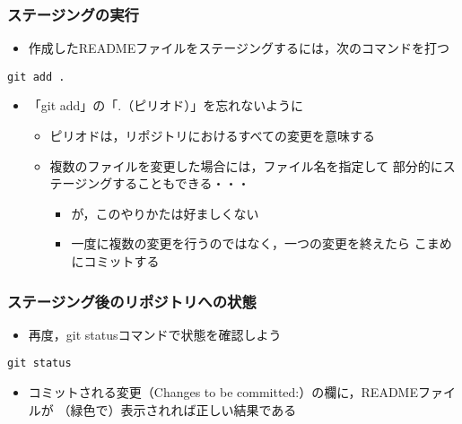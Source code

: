 \documentclass[a4paper,twoside,twocolumn]{bxjsarticle}
\begin{document}
\subsubsection{ステージングの実行}
\label{sec-1-3-5}
\begin{itemize}
\item 作成したREADMEファイルをステージングするには，次のコマンドを打つ
\end{itemize}

\begin{verbatim}
git add .
\end{verbatim}

\begin{itemize}
\item 「git add」の「.（ピリオド）」を忘れないように
\begin{itemize}
\item ピリオドは，リポジトリにおけるすべての変更を意味する
\item 複数のファイルを変更した場合には，ファイル名を指定して
部分的にステージングすることもできる・・・
\begin{itemize}
\item が，このやりかたは好ましくない
\item 一度に複数の変更を行うのではなく，一つの変更を終えたら
こまめにコミットする
\end{itemize}
\end{itemize}
\end{itemize}

\subsubsection{ステージング後のリポジトリへの状態}
\label{sec-1-3-6}
\begin{itemize}
\item 再度，git statusコマンドで状態を確認しよう
\end{itemize}

\begin{verbatim}
git status
\end{verbatim}

\begin{itemize}
\item コミットされる変更（Changes to be committed:）の欄に，READMEファイルが
（緑色で）表示されれば正しい結果である
\end{itemize}
\end{document}
